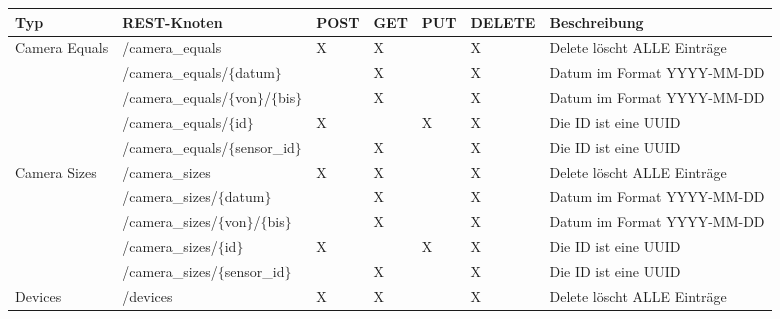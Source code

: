 \begin{landscape}
  \begin{table}[H]
    \begin{longtable}{lllllll}
      \textbf{Typ}                    & \textbf{REST-Knoten}                    & \textbf{POST} & \textbf{GET} & \textbf{PUT} & \textbf{DELETE} & \textbf{Beschreibung}   \\ \toprule
      \multirow{5}{*}{Camera Equals}  & /camera\_equals                         & X & X &   & X & Delete löscht ALLE Einträge                                             \\
                                      & /camera\_equals/$\{$datum$\}$           &   & X &   & X & Datum im Format YYYY-MM-DD                                              \\
                                      & /camera\_equals/$\{$von$\}$/$\{$bis$\}$ &   & X &   & X & Datum im Format YYYY-MM-DD                                              \\
                                      & /camera\_equals/$\{$id$\}$              & X &   & X & X & Die ID ist eine UUID                                                    \\
                                      & /camera\_equals/$\{$sensor\_id$\}$      &   & X &   & X & Die ID ist eine UUID                                                    \\ \midrule
      \multirow{5}{*}{Camera Sizes}   & /camera\_sizes                          & X & X &   & X & Delete löscht ALLE Einträge                                             \\
                                      & /camera\_sizes/$\{$datum$\}$            &   & X &   & X & Datum im Format YYYY-MM-DD                                              \\
                                      & /camera\_sizes/$\{$von$\}$/$\{$bis$\}$  &   & X &   & X & Datum im Format YYYY-MM-DD                                              \\
                                      & /camera\_sizes/$\{$id$\}$               & X &   & X & X & Die ID ist eine UUID                                                    \\
                                      & /camera\_sizes/$\{$sensor\_id$\}$       &   & X &   & X & Die ID ist eine UUID                                                    \\ \midrule
      \multirow{3}{*}{Devices}        & /devices                                & X & X &   & X & Delete löscht ALLE Einträge                                             \\

\end{longtable}
\end{table}
\end{landscape}
